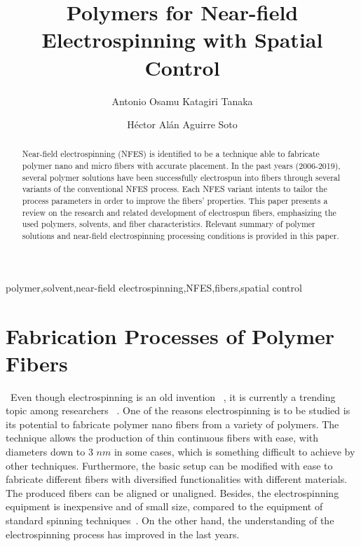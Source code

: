 \documentclass[5p,,preprint,12pt,twocolumn]{elsarticle}
\begin{document}


\begin{frontmatter}
	
\title{Polymers for Near-field Electrospinning with Spatial Control
}
    
\author[]{Antonio Osamu Katagiri Tanaka}
\author[]{H{\'e}ctor Al\'{a}n Aguirre Soto}
    

\begin{abstract}
Near-field electrospinning (NFES) is identified to be a technique able to fabricate polymer nano and micro fibers with accurate placement. In the past years (2006-2019), several polymer solutions have been successfully electrospun into fibers through several variants of the conventional NFES process. Each NFES variant intents to tailor the process parameters in order to improve the fibers' properties. This paper presents a review on the research and related development of electrospun fibers, emphasizing the used polymers, solvents, and fiber characteristics. Relevant summary of polymer solutions and near-field electrospinning processing conditions is provided in this paper.
\end{abstract}
\begin{keyword} 
polymer\sep solvent\sep near-field electrospinning\sep NFES\sep fibers\sep spatial control
\end{keyword}

\end{frontmatter}
\tableofcontents

    
\section{Fabrication Processes of Polymer Fibers}
~Even though electrospinning is an old invention \unskip~\cite{527120:12073288}, it is currently a trending topic among researchers \unskip~\cite{527120:12073453,527120:12073495,527120:12073496}. One of the reasons electrospinning is to be studied is its potential to fabricate polymer nano fibers from a variety of polymers. The technique allows the production of thin continuous fibers with ease, with diameters down to 3 $nm $ in some cases, which is something difficult to achieve by other techniques. Furthermore, the basic setup can be modified with ease to fabricate different fibers with diversified functionalities with different materials. The produced fibers can be aligned or unaligned. Besides, the electrospinning equipment is inexpensive and of small size, compared to the equipment of standard spinning techniques\unskip~\cite{527120:12073538}. On the other hand, the understanding of the electrospinning process has improved in the last years.
\end{document}
